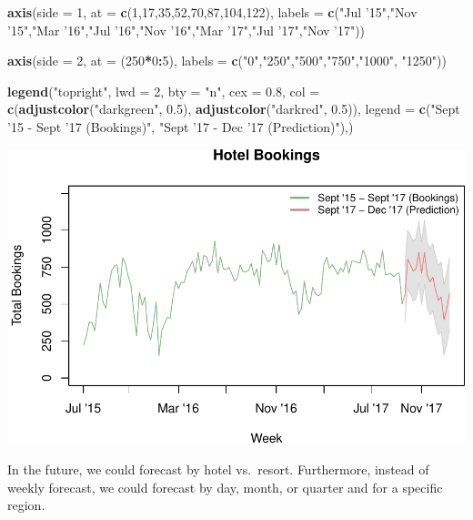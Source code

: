 \documentclass[]{article}
\newenvironment{Shaded}{\begin{snugshade}}{\end{snugshade}}
\newcommand{\DataTypeTok}[1]{\textcolor[rgb]{0.13,0.29,0.53}{#1}}
\newcommand{\DecValTok}[1]{\textcolor[rgb]{0.00,0.00,0.81}{#1}}
\newcommand{\FloatTok}[1]{\textcolor[rgb]{0.00,0.00,0.81}{#1}}
\newcommand{\KeywordTok}[1]{\textcolor[rgb]{0.13,0.29,0.53}{\textbf{#1}}}
\newcommand{\NormalTok}[1]{#1}
\newcommand{\OperatorTok}[1]{\textcolor[rgb]{0.81,0.36,0.00}{\textbf{#1}}}
\newcommand{\StringTok}[1]{\textcolor[rgb]{0.31,0.60,0.02}{#1}}
\begin{document}
\begin{Shaded}
\begin{Highlighting}[]
\KeywordTok{axis}\NormalTok{(}\DataTypeTok{side =} \DecValTok{1}\NormalTok{, }\DataTypeTok{at =} \KeywordTok{c}\NormalTok{(}\DecValTok{1}\NormalTok{,}\DecValTok{17}\NormalTok{,}\DecValTok{35}\NormalTok{,}\DecValTok{52}\NormalTok{,}\DecValTok{70}\NormalTok{,}\DecValTok{87}\NormalTok{,}\DecValTok{104}\NormalTok{,}\DecValTok{122}\NormalTok{),}
     \DataTypeTok{labels =} \KeywordTok{c}\NormalTok{(}\StringTok{"Jul '15"}\NormalTok{,}\StringTok{"Nov '15"}\NormalTok{,}\StringTok{"Mar '16"}\NormalTok{,}\StringTok{"Jul '16"}\NormalTok{,}\StringTok{"Nov '16"}\NormalTok{,}\StringTok{"Mar '17"}\NormalTok{,}\StringTok{"Jul '17"}\NormalTok{,}\StringTok{"Nov '17"}\NormalTok{))}

\KeywordTok{axis}\NormalTok{(}\DataTypeTok{side =} \DecValTok{2}\NormalTok{, }\DataTypeTok{at =}\NormalTok{ (}\DecValTok{250}\OperatorTok{*}\DecValTok{0}\OperatorTok{:}\DecValTok{5}\NormalTok{), }\DataTypeTok{labels =} \KeywordTok{c}\NormalTok{(}\StringTok{"0"}\NormalTok{,}\StringTok{"250"}\NormalTok{,}\StringTok{"500"}\NormalTok{,}\StringTok{"750"}\NormalTok{,}\StringTok{"1000"}\NormalTok{, }\StringTok{"1250"}\NormalTok{))}

\KeywordTok{legend}\NormalTok{(}\StringTok{"topright"}\NormalTok{,}
       \DataTypeTok{lwd =} \DecValTok{2}\NormalTok{,}
       \DataTypeTok{bty =} \StringTok{"n"}\NormalTok{,}
       \DataTypeTok{cex =} \FloatTok{0.8}\NormalTok{,}
       \DataTypeTok{col =} \KeywordTok{c}\NormalTok{(}\KeywordTok{adjustcolor}\NormalTok{(}\StringTok{"darkgreen"}\NormalTok{, }\FloatTok{0.5}\NormalTok{), }\KeywordTok{adjustcolor}\NormalTok{(}\StringTok{"darkred"}\NormalTok{, }\FloatTok{0.5}\NormalTok{)),}
       \DataTypeTok{legend =} \KeywordTok{c}\NormalTok{(}\StringTok{"Sept '15 - Sept '17 (Bookings)"}\NormalTok{, }\StringTok{"Sept '17 - Dec '17 (Prediction)"}\NormalTok{),)}
\end{Highlighting}
\end{Shaded}

\begin{center}\includegraphics{bookings_forecast_files/figure-latex/unnamed-chunk-15-1} \end{center}

In the future, we could forecast by hotel vs.~resort. Furthermore,
instead of weekly forecast, we could forecast by day, month, or quarter
and for a specific region.
\end{document}
